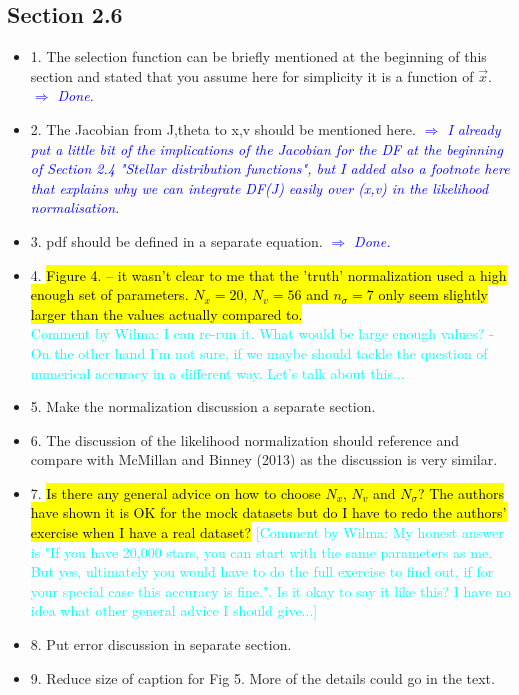 \documentclass[10pt,a4paper]{article}
\newcommand{\HW}[1]{\textcolor{Cyan}{#1}}
\newcommand{\Comment}[1]{\textsl{\textcolor{Blue}{$\Longrightarrow$ {#1}}}}
\begin{document}
\subsection{Section 2.6}
\begin{itemize}
\item 1. The selection function can be briefly mentioned at the beginning of this section and stated that you assume here for simplicity it is a function of $\vec{x}$. \Comment{Done.}
\item 2. The Jacobian from J,theta to x,v should be mentioned here. \Comment{I already put a little bit of the implications of the Jacobian for the DF at the beginning of Section 2.4 "Stellar distribution functions", but I added also a footnote here that explains why we can integrate DF(J) easily over (x,v) in the likelihood normalisation.}
\item 3. pdf should be defined in a separate equation. \Comment{Done.}
\item 4. \hl{Figure 4. -- it wasn't clear to me that the 'truth' normalization used a high enough set of parameters. $N_x=20$, $N_v=56$ and $n_\sigma=7$ only seem slightly larger than the values actually compared to.}\\\HW{Comment by Wilma: I can re-run it. What would be large enough values? - On the other hand I'm not sure, if we maybe should tackle the question of numerical accuracy in a different way. Let's talk about this...}
\item 5. Make the normalization discussion a separate section.
\item 6. The discussion of the likelihood normalization should reference and compare with McMillan and Binney (2013) as the discussion is very similar.
\item 7. \hl{Is there any general advice on how to choose $N_x$, $N_v$ and $N_\sigma$? The authors have shown it is OK for the mock datasets but do I have to redo the authors' exercise when I have a real dataset?} \HW{[Comment by Wilma: My honest answer is "If you have 20,000 stars, you can start with the same parameters as me. But yes, ultimately you would have to do the full exercise to find out, if for your special case this accuracy is fine.". Is it okay to say it like this? I have no idea what other general advice I should give...]}
\item 8. Put error discussion in separate section.
\item 9. Reduce size of caption for Fig 5. More of the details could go in the text.

\end{itemize}
\end{document}
